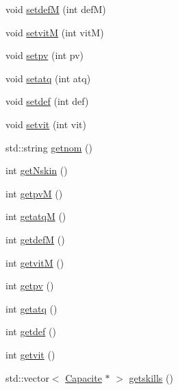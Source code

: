 \begin{DoxyCompactItemize}
\item 
void \hyperlink{class_vaisseau_a4120a8c40229b8af08590ee3a6d00f6a}{setdefM} (int defM)
\item 
void \hyperlink{class_vaisseau_a5816b1761b1d6f12f2ee3077b938392a}{setvitM} (int vitM)
\item 
void \hyperlink{class_vaisseau_a2c9cf0b0520a6bee6408af58e3c99e34}{setpv} (int pv)
\item 
void \hyperlink{class_vaisseau_a5dac2a3814de298d8d515c20b7463397}{setatq} (int atq)
\item 
void \hyperlink{class_vaisseau_aa6a93a1d1bfd8f7bac3e079fff6d84fa}{setdef} (int def)
\item 
void \hyperlink{class_vaisseau_a86c2165e77892f03e8d08f1e509e9b10}{setvit} (int vit)
\item 
std\+::string \hyperlink{class_vaisseau_acbe2e5af7beda381d21392d4eb539761}{getnom} ()
\item 
int \hyperlink{class_vaisseau_aaecdafade1e84272e58cc97558f7c5c3}{get\+Nskin} ()
\item 
int \hyperlink{class_vaisseau_aac552ebb8c5b199c0f0e38b1f1cd95af}{getpvM} ()
\item 
int \hyperlink{class_vaisseau_a893c8a6199e3e79460891fafb0b16fba}{getatqM} ()
\item 
int \hyperlink{class_vaisseau_aa983d5040f7c19a9dfcb907618fda321}{getdefM} ()
\item 
int \hyperlink{class_vaisseau_a78f7e268cdb61a39e3292e80309a4ca8}{getvitM} ()
\item 
int \hyperlink{class_vaisseau_ae8e571f83be3f2bc1b961841f872265e}{getpv} ()
\item 
int \hyperlink{class_vaisseau_a03d9f614943176d1e1d71d99f9d7f465}{getatq} ()
\item 
int \hyperlink{class_vaisseau_a48d7facfa7c34a784bfbee4c4b1100ce}{getdef} ()
\item 
int \hyperlink{class_vaisseau_a3ca57eda788c37034f9769d79f814dac}{getvit} ()
\item 
std\+::vector$<$ \hyperlink{class_capacite}{Capacite} $\ast$ $>$ \hyperlink{class_vaisseau_a40cb016e98f0f928b32b3b4a47e27599}{getskills} ()
\end{DoxyCompactItemize}
